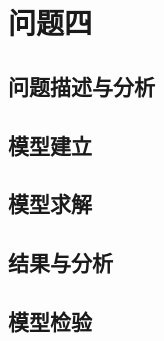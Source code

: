 \section{问题四}
\subsection{问题描述与分析}
\subsection{模型建立}
\subsection{模型求解}
\subsection{结果与分析}
\subsection{模型检验}
